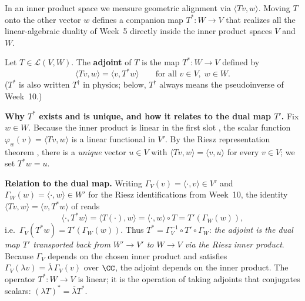 \documentclass[10pt]{scrartcl}
\newcommand{\LL}{\mathcal L}\newcommand{\PP}{\mathcal P}\newcommand{\MM}{\mathcal M}
\begin{document}
In an inner product space we measure geometric alignment via $\langle Tv,w\rangle$. Moving $T$ onto the other vector $w$ defines a companion map $T^*\colon W\to V$ that realizes all the linear-algebraic duality of Week~5 directly inside the inner product spaces $V$ and $W$.

\begin{definition*}
  Let $T\in\LL(V,W)$. The \textbf{adjoint} of $T$ is the map $T^*\colon W\to V$ defined by
  \[
    \langle Tv,w\rangle = \langle v,T^*w\rangle \qquad \text{for all } v\in V,\; w\in W.
  \]
  ($T^*$ is also written $T^\dagger$ in physics; below, $T^\dagger$ always means the pseudoinverse of Week~10.)
\end{definition*}

\begin{ideabox}
  \textbf{Why $T^*$ exists and is unique, and how it relates to the dual map $T'$.} Fix $w\in W$. Because the inner product is linear in the first slot , the scalar function $\varphi_w(v)=\langle Tv,w\rangle$ is a linear functional in $V'$. By the Riesz representation theorem , there is a \emph{unique} vector $u\in V$ with $\langle Tv,w\rangle=\langle v,u\rangle$ for every $v\in V$; we set $T^*w=u$.
\end{ideabox}

\textbf{Relation to the dual map.} Writing $\Gamma_V(v)=\langle\cdot,v\rangle\in V'$ and $\Gamma_W(w)=\langle\cdot,w\rangle\in W'$ for the Riesz identifications from Week~10, the identity $\langle Tv,w\rangle=\langle v,T^*w\rangle$ of  reads
  \[
    \langle \cdot,T^*w\rangle = \langle T(\cdot),w\rangle = \langle\cdot,w\rangle\circ T = T'(\Gamma_W(w)),
  \]
  i.e.\ $\Gamma_V(T^*w)=T'(\Gamma_W(w))$. Thus $T^*=\Gamma_V^{-1}\circ T'\circ \Gamma_W$: \emph{the adjoint is the dual map $T'$ transported back from $W'\to V'$ to $W\to V$ via the Riesz inner product}. Because $\Gamma_V$ depends on the chosen inner product and satisfies $\Gamma_V(\lambda v)=\overline{\lambda}\,\Gamma_V(v)$ over $\CC$, the adjoint depends on the inner product. The operator $T^*\colon W\to V$ is linear; it is the operation of taking adjoints that conjugates scalars: $(\lambda T)^*=\overline{\lambda}T^*$.
\end{document}
